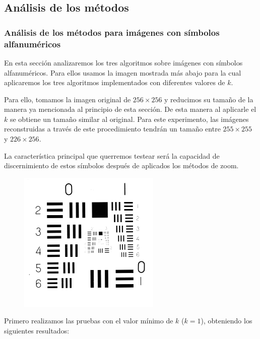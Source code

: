 \subsection{Análisis de los métodos}
\subsubsection{Análisis de los métodos para imágenes con símbolos alfanuméricos}
En esta sección analizaremos los tres algoritmos sobre imágenes con símbolos alfanuméricos. Para ellos usamos la imagen mostrada más abajo para la cual aplicaremos los tres algoritmos implementados con diferentes valores de $k$.

Para ello, tomamos la imagen original de $256 \times 256$ y reducimos su tamaño de la manera ya mencionada al principio de esta sección. De esta manera al aplicarle el $k$ se obtiene un tamaño similar al original. Para este experimento, las imágenes reconstruidas a través de este procedimiento tendrán un tamaño entre $255 \times 255$ y $226 \times 256$.

La característica principal que querremos testear será la capacidad de discernimiento de estos símbolos después de aplicados los métodos de zoom.

\begin{figure}[H]
\centering
\includegraphics[scale=0.50]{fotos/alfanum/orig.png}
\end{figure}

Primero realizamos las pruebas con el valor mínimo de $k$ ($k=1$), obteniendo los siguientes resultados:


